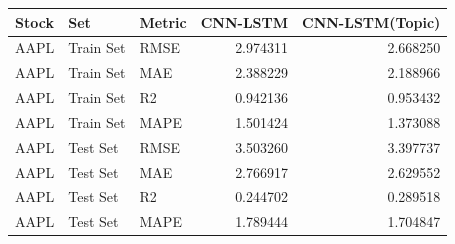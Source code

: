 \begin{tabular}{lllrr}
\toprule
Stock & Set & Metric & CNN-LSTM & CNN-LSTM(Topic) \\
\midrule
AAPL & Train Set & RMSE & 2.974311 & 2.668250 \\
AAPL & Train Set & MAE & 2.388229 & 2.188966 \\
AAPL & Train Set & R2 & 0.942136 & 0.953432 \\
AAPL & Train Set & MAPE & 1.501424 & 1.373088 \\
AAPL & Test Set & RMSE & 3.503260 & 3.397737 \\
AAPL & Test Set & MAE & 2.766917 & 2.629552 \\
AAPL & Test Set & R2 & 0.244702 & 0.289518 \\
AAPL & Test Set & MAPE & 1.789444 & 1.704847 \\
\bottomrule
\end{tabular}
